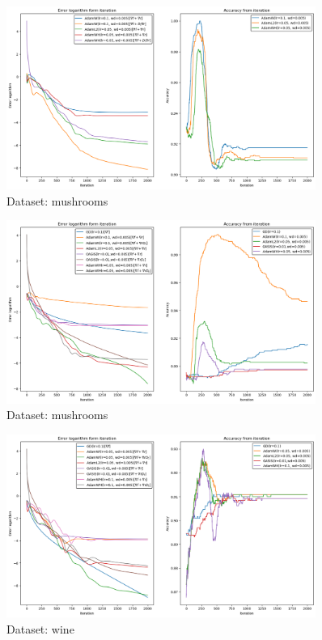 \documentclass{article}
\begin{document}
\begin{figure}[H]
\centering
    \includegraphics[width=0.9\textwidth]{pictures/mushrooms/main_adam.png}
    \caption{Dataset: mushrooms}
    
        \label{fig:main_mushrooms_adam}
\end{figure}

\begin{figure}[H]
\centering
    \includegraphics[width=0.9\textwidth]{pictures/mushrooms/main_mushrooms.png}
    \caption{Dataset: mushrooms}
    
        \label{fig:main_mushrooms}
\end{figure}

\begin{figure}[H]
\centering
    \includegraphics[width=0.9\textwidth]{pictures/wine/main_wine.png}
    \caption{Dataset: wine}
    
        \label{fig:main_wine}
\end{figure}
\end{document}

